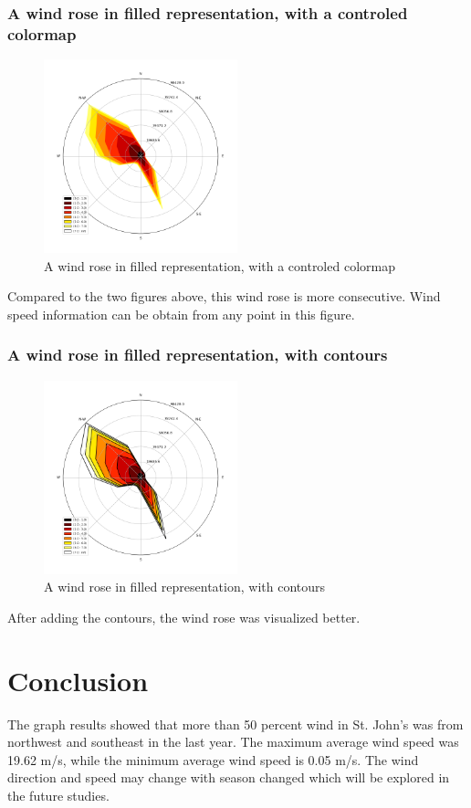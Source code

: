 \documentclass[10pt]{report}
\begin{document}
\subsection{A wind rose in filled representation, with a controled colormap}
 \begin{figure}[h!]
    \centering
    \includegraphics[width=0.50\textwidth]{images/figure4.png}
    \caption{A wind rose in filled representation, with a controled colormap}
    \label{fig: PaleBlueDot}    
\end{figure}
Compared to the two figures above, this wind rose is more consecutive. Wind speed information can be obtain from any point in this figure.

\subsection{A wind rose in filled representation, with contours}
 \begin{figure}[h!]
    \centering
    \includegraphics[width=0.50\textwidth]{images/figure5.png}
    \caption{A wind rose in filled representation, with contours}
    \label{fig: PaleBlueDot}    
\end{figure}
After adding the contours, the wind rose was visualized better.
 
 \chapter{Conclusion}
 The graph results showed that more than 50 percent wind in St. John's was from northwest and southeast in the last year. The maximum average wind speed was 19.62 m/s, while the minimum average wind speed is 0.05 m/s. The wind direction and speed may change with season changed which will be explored in the future studies.

\printbibliography
\end{document}
